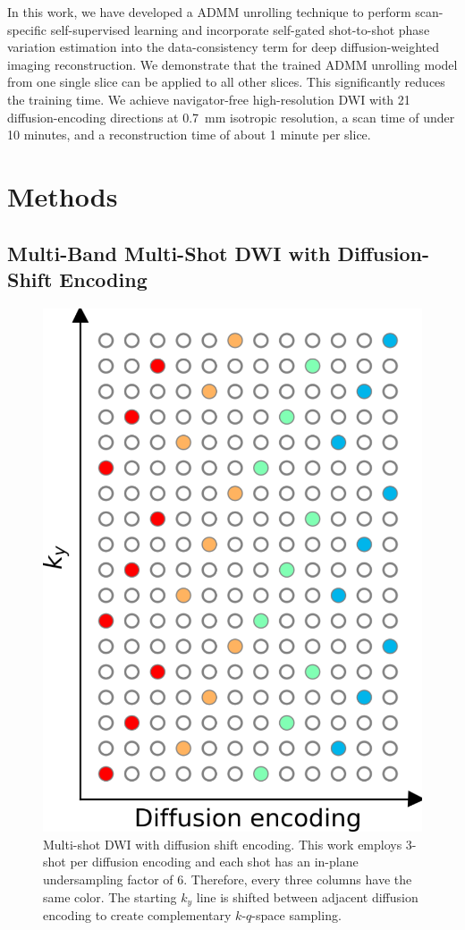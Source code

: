 \documentclass[AMA,STIX2COL,Linenumberson]{MRM}
\begin{document}
In this work, we have developed a ADMM unrolling technique
to perform scan-specific self-supervised learning
and incorporate self-gated shot-to-shot phase variation estimation
into the data-consistency term for deep diffusion-weighted imaging reconstruction.
We demonstrate that the trained ADMM unrolling model from one single slice
can be applied to all other slices.
This significantly reduces the training time.
We achieve navigator-free high-resolution DWI with 21 diffusion-encoding
directions at \SI{0.7}{\milli\meter} isotropic resolution,
a scan time of under 10 minutes, and a reconstruction time of about 1 minute per slice.


\section{Methods}\label{SEC:METHODS}

\subsection{Multi-Band Multi-Shot DWI with Diffusion-Shift Encoding}

\begin{figure}
	\centering
	\includegraphics[width=0.8\columnwidth]{./figures/fig1.png}
	\caption{Multi-shot DWI with diffusion shift encoding. 
		This work employs 3-shot per diffusion encoding and each shot has an in-plane undersampling factor of 6.
		Therefore, every three columns have the same color. The starting $k_y$ line is shifted between 
		adjacent diffusion encoding to create complementary $k$-$q$-space sampling.}
	\label{FIG:SHIFT}
\end{figure}
\end{document}
